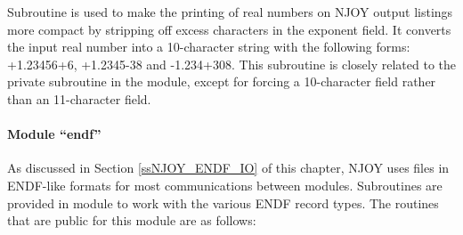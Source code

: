 Subroutine  is used to make the printing of real numbers
on NJOY output listings more compact by stripping off excess
characters in the exponent field.  It converts the input real
number into a 10-character string with the following forms:
+1.23456+6, +1.2345-38 and -1.234+308.
This subroutine is closely related to the private subroutine
 in the  module, except for forcing a
10-character field rather than an 11-character field.

\paragraph{Module ``endf''}

As discussed in Section \ref{ssNJOY_ENDF_IO} of this chapter, NJOY uses
files in ENDF-like formats for most communications between modules.
Subroutines are provided in module  to work with the various
ENDF record types.  The routines that are public for this module are
as follows:

